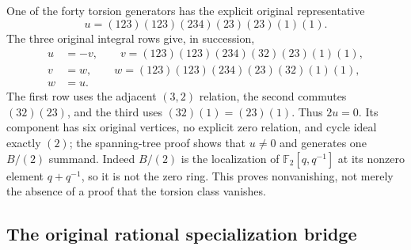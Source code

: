 One of the forty torsion generators has the explicit
original representative
\[
u=(123)(123)(234)(23)(23)(1)(1).
\]
The three original integral rows give, in succession,
\[
\begin{aligned}
u&=-v,\qquad
 v=(123)(123)(234)(32)(23)(1)(1),\\
v&=w,\qquad
 w=(123)(123)(234)(23)(32)(1)(1),\\
w&=u.
\end{aligned}
\]
The first row uses the adjacent $(3,2)$ relation, the
second commutes $(32)(23)$, and the third uses
$(32)(1)=(23)(1)$. Thus $2u=0$. Its component has
six original vertices, no explicit zero relation, and
cycle ideal exactly $(2)$; the spanning-tree proof shows
that $u\ne0$ and generates one $B/(2)$ summand.
Indeed $B/(2)$ is the localization of
$\mathbb F_2[q,q^{-1}]$ at its nonzero element
$q+q^{-1}$, so it is not the zero ring. This proves
nonvanishing, not merely the absence of a proof that
the torsion class vanishes.

\subsection{The original rational specialization bridge}


